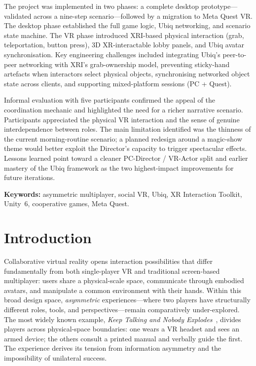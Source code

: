 \documentclass[12pt,a4paper]{article}
\begin{document}
The project was implemented in two phases: a complete desktop prototype---validated across a nine-step scenario---followed by a migration to Meta Quest VR. The desktop phase established the full game logic, Ubiq networking, and scenario state machine. The VR phase introduced XRI-based physical interaction (grab, teleportation, button press), 3D XR-interactable lobby panels, and Ubiq avatar synchronisation. Key engineering challenges included integrating Ubiq's peer-to-peer networking with XRI's grab-ownership model, preventing sticky-hand artefacts when interactors select physical objects, synchronising networked object state across clients, and supporting mixed-platform sessions (PC + Quest).

Informal evaluation with five participants confirmed the appeal of the coordination mechanic and highlighted the need for a richer narrative scenario. Participants appreciated the physical VR interaction and the sense of genuine interdependence between roles. The main limitation identified was the thinness of the current morning-routine scenario; a planned redesign around a magic-show theme would better exploit the Director's capacity to trigger spectacular effects. Lessons learned point toward a cleaner PC-Director / VR-Actor split and earlier mastery of the Ubiq framework as the two highest-impact improvements for future iterations.

\medskip
\noindent\textbf{Keywords:} asymmetric multiplayer, social VR, Ubiq, XR Interaction Toolkit, Unity~6, cooperative games, Meta Quest.

\newpage
\tableofcontents
\newpage

\section{Introduction}
\label{sec:intro}

Collaborative virtual reality opens interaction possibilities that differ fundamentally from both single-player VR and traditional screen-based multiplayer: users share a physical-scale space, communicate through embodied avatars, and manipulate a common environment with their hands. Within this broad design space, \emph{asymmetric} experiences---where two players have structurally different roles, tools, and perspectives---remain comparatively under-explored. The most widely known example, \emph{Keep Talking and Nobody Explodes}~\cite{keeptalking2015}, divides players across physical-space boundaries: one wears a VR headset and sees an armed device; the others consult a printed manual and verbally guide the first. The experience derives its tension from information asymmetry and the impossibility of unilateral success.
\end{document}
